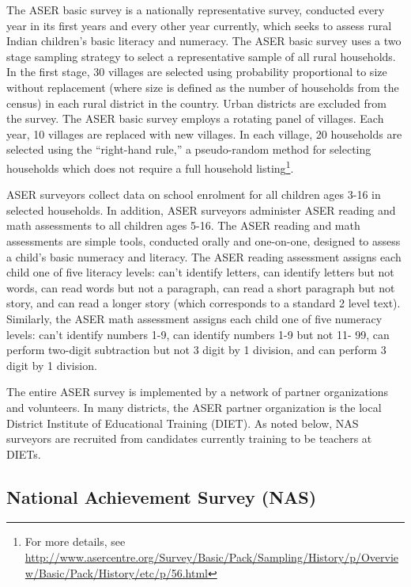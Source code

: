 \documentclass[
  11pt,
]{article}
\begin{document}
The ASER basic survey is a nationally representative survey, conducted every year in its first years and every other year currently, which seeks to assess rural Indian children's basic literacy and numeracy. The ASER basic survey uses a two stage sampling strategy to select a representative sample of all rural households. In the first stage, 30 villages are selected using probability proportional to size without replacement (where size is defined as the number of households from the census) in each rural district in the country. Urban districts are excluded from the survey. The ASER basic survey employs a rotating panel of villages. Each year, 10 villages are replaced with new villages. In each village, 20 households are selected using the ``right-hand rule,'' a pseudo-random method for selecting households which does not require a full household listing\footnote{For more details, see
  \url{http://www.asercentre.org/Survey/Basic/Pack/Sampling/History/p/Overview/Basic/Pack/History/etc/p/56.html}}.

ASER surveyors collect data on school enrolment for all children ages 3-16 in selected households. In addition, ASER surveyors administer ASER reading and math assessments to all children ages 5-16. The ASER reading and math assessments are simple tools, conducted orally and one-on-one, designed to assess a child's basic numeracy and literacy. The ASER reading assessment assigns each child one of five literacy levels: can't identify letters, can identify letters but not words, can read words but not a paragraph, can read a short paragraph but not story, and can read a longer story (which corresponds to a standard 2 level text). Similarly, the ASER math assessment assigns each child one of five numeracy levels: can't identify numbers 1-9, can identify numbers 1-9 but not 11- 99, can perform two-digit subtraction but not 3 digit by 1 division, and can perform 3 digit by 1 division.

The entire ASER survey is implemented by a network of partner organizations and volunteers. In many districts, the ASER partner organization is the local District Institute of Educational Training (DIET). As noted below, NAS surveyors are recruited from candidates currently training to be teachers at DIETs.

\hypertarget{national-achievement-survey-nas}{%
\subsection{National Achievement Survey (NAS)}\label{national-achievement-survey-nas}}
\end{document}

